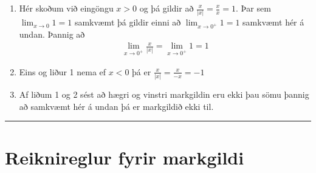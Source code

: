\documentclass[a4paper,10pt,icelandic]{sphinxmanual}
\begin{document}
\noindent{}
\begin{enumerate}
\item {} 
Hér skoðum við eingöngu \(x>0\) og þá gildir að
\(\frac x{|x|} = \frac xx = 1\). Þar sem
\(\lim_{x \to 0} 1 = 1\) samkvæmt {\hyperref[\detokenize{kafli02:daemi2-1}]{}}
þá gildir einni að \(\lim_{x \to 0^+} 1 = 1\) samkvæmt
{\hyperref[\detokenize{kafli02:setning-hv-markgildi}]{}}
hér á undan. Þannig að
\begin{equation*}
\begin{split}\lim_{x \to 0^+} \frac x{|x|} =
\lim_{x \to 0^+} 1 = 1\end{split}
\end{equation*}
\item {} 
Eins og liður 1 nema ef \(x<0\) þá er
\(\frac x{|x|} = \frac x{-x} = -1\)

\item {} 
Af liðum 1 og 2 sést að hægri og vinstri markgildin eru ekki þau sömu þannig
að samkvæmt {\hyperref[\detokenize{kafli02:setning-hv-markgildi}]{}} hér á undan þá er
markgildið ekki til.

\end{enumerate}


\bigskip\hrule\bigskip



\section{Reiknireglur fyrir markgildi}
\label{\detokenize{kafli02:reiknireglur-fyrir-markgildi}}
\end{document}
